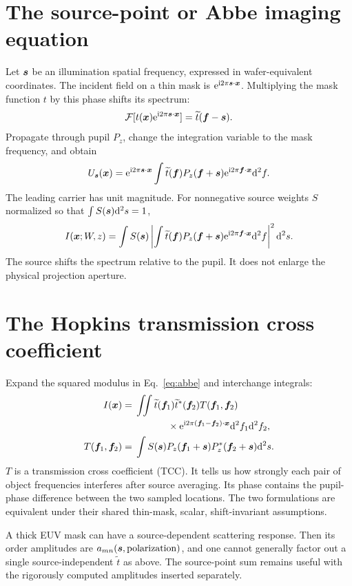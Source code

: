 \section{The source-point or Abbe imaging equation}
Let $\bm{s}$ be an illumination spatial frequency, expressed in
wafer-equivalent coordinates. The incident field on a thin mask is
$\mathrm{e}^{\mathrm{i}2\pi\bm{s}\cdot\bm{x}}$.
Multiplying the mask function $t$ by this phase shifts its spectrum:
\[
\mathcal{F}[t(\bm{x})\mathrm{e}^{\mathrm{i}2\pi\bm{s}\cdot\bm{x}}]
=\widetilde t(\bm{f}-\bm{s}).
\]
Propagate through pupil $P_z$, change the integration variable to the
mask frequency, and obtain
\begin{equation}
U_{\bm{s}}(\bm{x})=
\mathrm{e}^{\mathrm{i}2\pi\bm{s}\cdot\bm{x}}
\int\widetilde t(\bm{f})P_z(\bm{f}+\bm{s})
\mathrm{e}^{\mathrm{i}2\pi\bm{f}\cdot\bm{x}}\mathrm{d}^2f.
\end{equation}
The leading carrier has unit magnitude. For nonnegative source weights
$S$ normalized so that $\int S(\bm{s})\mathrm{d}^2s=1$,
\begin{equation}
I(\bm{x};W,z)=
\int S(\bm{s})
\left|\int\widetilde t(\bm{f})P_z(\bm{f}+\bm{s})
\mathrm{e}^{\mathrm{i}2\pi\bm{f}\cdot\bm{x}}\mathrm{d}^2f\right|^2\mathrm{d}^2s.
\label{eq:abbe}
\end{equation}
The source shifts the spectrum relative to the pupil. It does not
enlarge the physical projection aperture.

\section{The Hopkins transmission cross coefficient}
Expand the squared modulus in Eq.~\eqref{eq:abbe} and interchange
integrals:
\begin{align}
I(\vct x)
={}&\iint\widetilde t(\vct f_1)\widetilde t^*(\vct f_2)
T(\vct f_1,\vct f_2)\\
&\hspace{12mm}\times
\ee^{\ii2\pi(\vct f_1-\vct f_2)\cdot\vct x}
\dd^2f_1\dd^2f_2,\\
T(\vct f_1,\vct f_2)
={}&\int S(\vct s)
P_z(\vct f_1+\vct s)P_z^*(\vct f_2+\vct s)\dd^2s.
\label{eq:tcc}
\end{align}
$T$ is a transmission cross coefficient (TCC). It tells us how strongly
each pair of object frequencies interferes after source averaging.
Its phase contains the pupil-phase difference between the two sampled
locations. The two formulations are equivalent under their shared
thin-mask, scalar, shift-invariant assumptions.

A thick EUV mask can have a source-dependent scattering response.
Then its order amplitudes are $a_{mn}(\bm{s},\mathrm{polarization})$,
and one cannot generally factor out a single source-independent
$\widetilde t$ as above. The source-point sum remains useful with the
rigorously computed amplitudes inserted separately.

